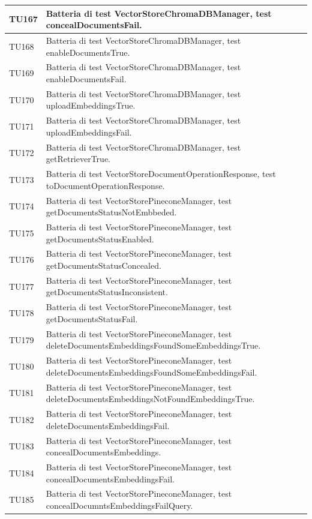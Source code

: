 \documentclass[10pt, a4paper]{article}
\begin{document}
\begin{xltabular}{\textwidth}{p{0.12\textwidth}|X}
TU167 & Batteria di test VectorStoreChromaDBManager, test concealDocumentsFail. \\
\hline
TU168 & Batteria di test VectorStoreChromaDBManager, test enableDocumentsTrue. \\
\hline
TU169 & Batteria di test VectorStoreChromaDBManager, test enableDocumentsFail. \\
\hline
TU170 & Batteria di test VectorStoreChromaDBManager, test uploadEmbeddingsTrue. \\
\hline
TU171 & Batteria di test VectorStoreChromaDBManager, test uploadEmbeddingsFail. \\
\hline
TU172 & Batteria di test VectorStoreChromaDBManager, test getRetrieverTrue. \\
\hline
TU173 & Batteria di test VectorStoreDocumentOperationResponse, test toDocumentOperationResponse. \\
\hline
TU174 & Batteria di test VectorStorePineconeManager, test getDocumentsStatusNotEmbbeded. \\
\hline
TU175 & Batteria di test VectorStorePineconeManager, test getDocumentsStatusEnabled. \\
\hline
TU176 & Batteria di test VectorStorePineconeManager, test getDocumentsStatusConcealed. \\
\hline
TU177 & Batteria di test VectorStorePineconeManager, test getDocumentsStatusInconsistent. \\
\hline
TU178 & Batteria di test VectorStorePineconeManager, test getDocumentsStatusFail. \\
\hline
TU179 & Batteria di test VectorStorePineconeManager, test deleteDocumentsEmbeddingsFoundSomeEmbeddingsTrue. \\
\hline
TU180 & Batteria di test VectorStorePineconeManager, test deleteDocumentsEmbeddingsFoundSomeEmbeddingsFail. \\
\hline
TU181 & Batteria di test VectorStorePineconeManager, test deleteDocumentsEmbeddingsNotFoundEmbeddingsTrue. \\
\hline
TU182 & Batteria di test VectorStorePineconeManager, test deleteDocumentsEmbeddingsFail. \\
\hline
TU183 & Batteria di test VectorStorePineconeManager, test concealDocumentsEmbeddings. \\
\hline
TU184 & Batteria di test VectorStorePineconeManager, test concealDocumentsEmbeddingsFail. \\
\hline
TU185 & Batteria di test VectorStorePineconeManager, test concealDocumntsEmbeddingsFailQuery. \\

\end{xltabular}
\end{document}

